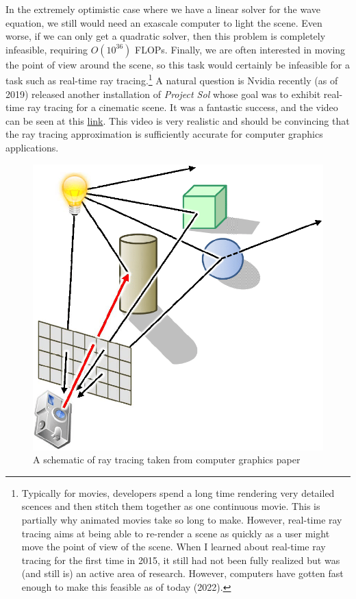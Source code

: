 In the extremely optimistic case where we have a linear solver for the wave equation, we still would need an exascale computer to light the scene. Even worse, if we can only get a quadratic solver, then this problem is completely infeasible, requiring $O(10^{36})$ FLOPs. Finally, we are often interested in moving the point of view around the scene, so this task would certainly be infeasible for a task such as real-time ray tracing.\footnote{Typically for movies, developers spend a long time rendering very detailed scences and then stitch them together as one continuous movie. This is partially why animated movies take so long to make. However, real-time ray tracing aims at being able to re-render a scene as quickly as a user might move the point of view of the scene. When I learned about real-time ray tracing for the first time in 2015, it still had not been fully realized but was (and still is) an active area of research. However, computers have gotten fast enough to make this feasible as of today (2022).}  A natural question is  Nvidia recently (as of 2019) released another installation of \textit{Project Sol} whose goal was to exhibit real-time ray tracing for a cinematic scene. It was a fantastic success, and the video can be seen at this \href{https://www.youtube.com/watch?v=pNmhJx8yPLk}{link}. This video is very realistic and should be convincing that the ray tracing approximation is sufficiently accurate for computer graphics applications.
\begin{figure}
    \centering
    \includegraphics[width=\textwidth]{images/RayTracing.png}
    \caption{A schematic of ray tracing taken from computer graphics paper \cite{retzlaff2017physically}}
    \label{fig:18:raytracing}
\end{figure}
